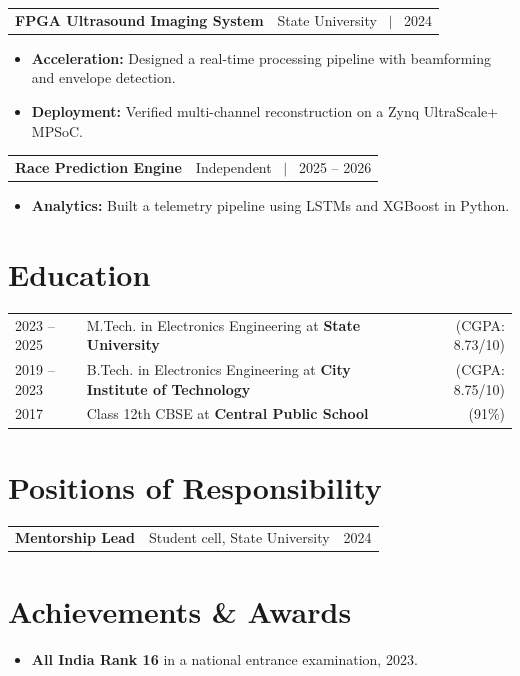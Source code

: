 \documentclass[a4paper,12pt]{article}
\makeatletter
\newenvironment{projectentry}[2]
  {\begin{tabularx}{\linewidth}{@{} X r @{}}\textbf{#1} & #2 \\\end{tabularx}
   \begin{itemize}[nosep, leftmargin=1em, label=--]}
  {\end{itemize}}
\makeatother
\begin{document}
\begin{projectentry}{FPGA Ultrasound Imaging System}{State University \ $|$ \ 2024}
    \item \textbf{Acceleration:} Designed a real-time processing pipeline with beamforming and envelope detection.
    \item \textbf{Deployment:} Verified multi-channel reconstruction on a Zynq UltraScale+ MPSoC.
\end{projectentry}

\begin{projectentry}{Race Prediction Engine}{Independent \ $|$ \ 2025 -- 2026}
    \item \textbf{Analytics:} Built a telemetry pipeline using LSTMs and XGBoost in Python.
\end{projectentry}

\section{Education}
\begin{tabularx}{\linewidth}{@{}l X r@{}}
2023 -- 2025 & M.Tech. in Electronics Engineering at \textbf{State University} & (CGPA: 8.73/10) \\
2019 -- 2023 & B.Tech. in Electronics Engineering at \textbf{City Institute of Technology} & (CGPA: 8.75/10) \\
2017 & Class 12th CBSE at \textbf{Central Public School} & (91\%) \\
\end{tabularx}

\section{Positions of Responsibility}
\begin{tabularx}{\linewidth}{@{}l X r@{}}
\textbf{Mentorship Lead} & Student cell, State University & 2024 \\
\end{tabularx}

\section{Achievements \& Awards}
\begin{itemize}[nosep, leftmargin=1em]
    \item \textbf{All India Rank 16} in a national entrance examination, 2023.
\end{itemize}
\end{document}
